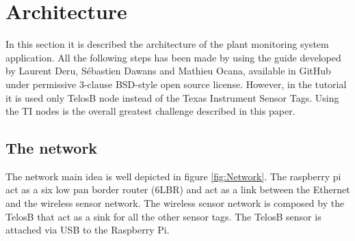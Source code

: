\section{Architecture}
In this section it is described the architecture of the plant monitoring system application. All the following steps has been made by using the guide developed by Laurent Deru, Sébastien Dawans and Mathieu Ocana, available in GitHub under permissive 3-clause BSD-style open source license. However, in the tutorial it is used only TelosB node instead of the Texas Instrument Sensor Tags. Using the TI nodes is the overall greatest challenge described in this paper.\\
\subsection{The network}
The network main idea is well depicted in figure \ref{fig:Network}. The raspberry pi act as a six low pan border router (6LBR) and act as a link between the Ethernet and the wireless sensor network. The wireless sensor network is composed by the TelosB that act as a sink for all the other sensor tags. The TelosB sensor is attached via USB to the Raspberry Pi.
